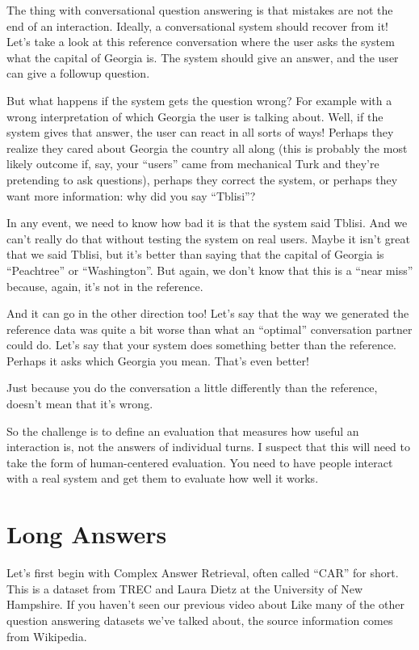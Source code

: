 The thing with conversational question answering is that mistakes are not the end of an interaction.  Ideally, a conversational system should recover from it!  Let’s take a look at this reference conversation where the user asks the system what the capital of Georgia is. The system should give an answer, and the user can give a followup question.

But what happens if the system gets the question wrong?  For example with a wrong interpretation of which Georgia the user is talking about.  Well, if the system gives that answer, the user can react in all sorts of ways!  Perhaps they realize they cared about Georgia the country all along (this is probably the most likely outcome if, say, your “users” came from mechanical Turk and they’re pretending to ask questions), perhaps they correct the system, or perhaps they want more information: why did you say “Tblisi”?

In any event, we need to know how bad it is that the system said Tblisi.  And we can’t really do that without testing the system on real users.  Maybe it isn’t great that we said Tblisi, but it’s better than saying that the capital of Georgia is “Peachtree” or “Washington”.  But again, we don’t know that this is a “near miss” because, again, it’s not in the reference.

And it can go in the other direction too!  Let’s say that the way we generated the reference data was quite a bit worse than what an “optimal” conversation partner could do.  Let’s say that your system does something better than the reference.  Perhaps it asks which Georgia you mean.  That’s even better!

Just because you do the conversation a little differently than the reference, doesn’t mean that it’s wrong.  

So the challenge is to define an evaluation that measures how useful an interaction is, not the answers of individual turns.  I suspect that this will need to take the form of human-centered evaluation.  You need to have people interact with a real system and get them to evaluate how well it works.

\section{Long Answers}
\label{sec:formats:long-answers}

Let’s first begin with Complex Answer Retrieval, often called “CAR” for short.  This is a dataset from TREC and Laura Dietz at the University of New Hampshire.  If you haven’t seen our previous video about Like many of the other question answering datasets we’ve talked about, the source information comes from Wikipedia.  


